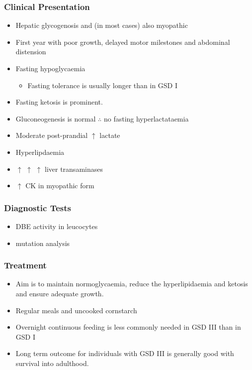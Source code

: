 \documentclass{scrartcl}
\begin{document}
\subsubsection{Clinical Presentation}
\label{sec:org68bee22}
\begin{itemize}
\item Hepatic glycogenosis and (in most cases) also myopathic
\item First year with poor growth, delayed motor milestones and abdominal
distension
\item Fasting hypoglycaemia 
\begin{itemize}
\item Fasting tolerance is usually longer than in GSD I
\end{itemize}
\item Fasting ketosis is prominent.
\item Gluconeogenesis is normal \(\therefore\) no fasting hyperlactataemia
\item Moderate post-prandial \(\uparrow\) lactate
\item Hyperlipdaemia
\item \(\uparrow\) \(\uparrow\) \(\uparrow\) liver transaminases
\item \(\uparrow\) CK in myopathic form
\end{itemize}
\subsubsection{Diagnostic Tests}
\label{sec:org039b295}
\begin{itemize}
\item DBE activity in leucocytes
\item mutation analysis
\end{itemize}
\subsubsection{Treatment}
\label{sec:org177ceb7}
\begin{itemize}
\item Aim is to maintain normoglycaemia, reduce the hyperlipidaemia and ketosis and
ensure adequate growth.
\item Regular meals and uncooked cornstarch
\item Overnight continuous feeding is less commonly needed in GSD III than
in GSD I
\item Long term outcome for individuals with GSD III is generally good
with survival into adulthood.
\end{itemize}
\end{document}
